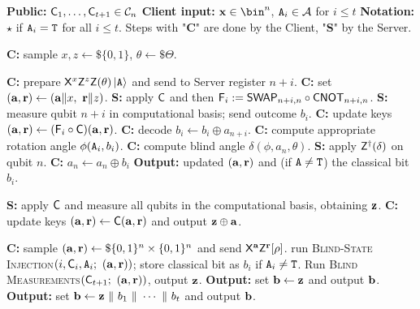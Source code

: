\begin{protocoll}
\caption{MB-DQC (without Back-And-Forth)}
\label{protocol:mblind_DQC}
\begin{algorithmic}[1]
\State \textbf{Public:} $\mathsf{C}_1,\ldots,\mathsf{C}_{t+1}\in\mathcal{C}_n$
\State \textbf{Client input:}  $\x\in\bin^n$, $\mathtt{A}_i\in\mathcal A$ for $i\le t$
\State \textbf{Notation:} $\star$ if $\mathtt{A}_i=\mathtt{T}$ for all $i\leq t$. Steps with "\textbf{C}" are done by the Client, "\textbf{S}" by the Server.

  \State \textbf{C:} sample $x,z\gets\$\{0,1\}$, $\theta\gets\$\Theta$.

  \State \textbf{C:} prepare $\mathsf{X}^{x}\mathsf{Z}^{z}\mathsf{Z}(\theta)\ket{\mathtt{A}}$ and send to Server register $n+i$.
  \State \textbf{C:} set $(\a,\r) \gets(\a\|x,\ \r\|z)$.
  \State \textbf{S:} apply $\mathsf{C}$ and then $\mathsf{F}_i := \mathsf{SWAP}_{n+i,n}\circ\mathsf{CNOT}_{n+i,n}$.
  \State \textbf{S:} measure qubit $n+i$ in computational basis; send outcome $b_i$.
  \State \textbf{C:} update keys $(\mathbf a,\mathbf r)\gets (\mathsf{F}_i\circ \mathsf{C})(\mathbf a,\mathbf r)$.
  \State \textbf{C:} decode $b_i \gets b_i \oplus a_{n+i}$.
  \State \textbf{C:} compute appropriate rotation angle $\phi(\mathtt{A}_i, b_i)$.
  \State \textbf{C:} compute blind angle $\delta(\phi, a_n, \theta)$.
  \State \textbf{S:} apply $\mathsf{Z}^\dagger(\delta)$ on qubit $n$.
  \If{$\A=\Tlabel$}
    \State \textbf{C:} $a_n \gets a_n \oplus b_i$ 
  \EndIf
  \State \textbf{Output:} updated $(\mathbf a,\mathbf r)$ and (if $\mathtt{A}\neq\mathtt{T}$) the classical bit $b_i$.
\EndProcedure

  \State \textbf{S:} apply $\mathsf{C}$ and measure all qubits in the computational basis, obtaining $\mathbf z$.
  \State \textbf{C:} update keys $(\mathbf a,\mathbf r)\gets \mathsf{C}(\mathbf a,\mathbf r)$ and output $\mathbf z\oplus \mathbf a$.
\EndProcedure

\Statex
{}
  \State \textbf{C:} sample $(\mathbf a,\mathbf r)\gets\$\{0,1\}^{n}\times\{0,1\}^{n}$ and send $\mathsf{X}^{\mathbf a}\mathsf{Z}^{\mathbf r}[\rho]$.
    \State run \textsc{Blind-State Injection}$(i,\mathsf{C}_i,\mathtt{A}_i;\ (\mathbf a,\mathbf r))$;
          store classical bit as $b_i$ if $\mathtt{A}_i\neq\mathtt{T}$.
  \EndFor
  \State Run \textsc{Blind Measurements}$(\mathsf{C}_{t+1};\ (\mathbf a,\mathbf r))$, output $\mathbf z$.
  \If{$\star$}
    \State \textbf{Output:} set $\mathbf b\gets \mathbf z$ and output $\mathbf b$.
  \Else
    \State \textbf{Output:} set $\mathbf b\gets \mathbf z\ \|\ b_1\ \|\ \cdots\ \|\ b_t$ and output $\mathbf b$.
  \EndIf
\EndProcedure
\end{algorithmic}
\end{protocoll}

